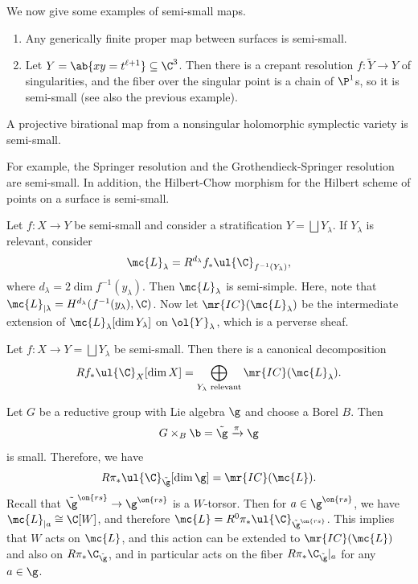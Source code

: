 \begin{exms}
    We now give some examples of semi-small maps.
    \begin{enumerate}
        \item Any generically finite proper map between surfaces is semi-small.
        \item Let \(Y = \ab\{xy = t^{\ell+1}\} \subseteq \C^3\). Then there is a crepant resolution \(f \colon \tilde{Y} \to Y\) of singularities, and the fiber over the singular point is a chain of \(\P^1\)s, so it is semi-small (see also the previous example).
    \end{enumerate}
\end{exms}

\begin{thm}
    A projective birational map from a nonsingular holomorphic symplectic variety is semi-small.
\end{thm}

\begin{exm}
    For example, the Springer resolution and the Grothendieck-Springer resolution are semi-small. In addition, the Hilbert-Chow morphism for the Hilbert scheme of points on a surface is semi-small.
\end{exm}

Let \(f \colon X \to Y\) be semi-small and consider a stratification \(Y = \bigsqcup Y_{\lambda}\). If \(Y_{\lambda}\) is relevant, consider
\[ \mc{L}_{\lambda} = R^{d_{\lambda}} f_* \ul{\C}_{f^{-1}(Y_{\lambda})}, \]
where \(d_{\lambda} = 2 \dim f^{-1} (y_{\lambda})\). Then \(\mc{L}_{\lambda}\) is semi-simple. Here, note that \(\mc{L}_{|\lambda} = H^{d_{\lambda}}(f^{-1}(y_{\lambda}), \C)\). Now let \(\mr{IC}(\mc{L}_{\lambda})\) be the intermediate extension of \(\mc{L}_{\lambda}[\dim Y_{\lambda}]\) on \(\ol{Y}_{\lambda}\), which is a perverse sheaf.

\begin{thm}
    Let \(f \colon X \to Y = \bigsqcup Y_{\lambda}\) be semi-small. Then there is a canonical decomposition
    \[ R f_* \ul{\C}_X[\dim X] = \bigoplus_{Y_{\lambda}\text{ relevant}} \mr{IC}(\mc{L}_{\lambda}). \]
\end{thm}

\begin{exm}
    Let \(G\) be a reductive group with Lie algebra \(\g\) and choose a Borel \(B\). Then
    \[ G \times_B \b = \tilde{\g} \xrightarrow{\pi} \g \]
    is small. Therefore, we have
    \[ R \pi_* \ul{\C}_{\tilde{\g}} [\dim \g] = \mr{IC}(\mc{L}). \]
    Recall that \(\tilde{\g}^{\on{rs}} \to \g^{\on{rs}}\) is a \(W\)-torsor. Then for \(a \in \g^{\on{rs}}\), we have \(\mc{L}_{|a} \cong \C[W]\), and therefore \(\mc{L} = R^0 \pi_* \ul{\C}_{\tilde{\g}^{\on{rs}}}\). This implies that \(W\) acts on \(\mc{L}\), and this action can be extended to \(\mr{IC}(\mc{L})\) and also on \(R \pi_* \C_{\tilde{\g}}\), and in particular acts on the fiber \(R \pi_* \C_{\tilde{\g}}|_a\) for any \(a \in \g\).
\end{exm}

